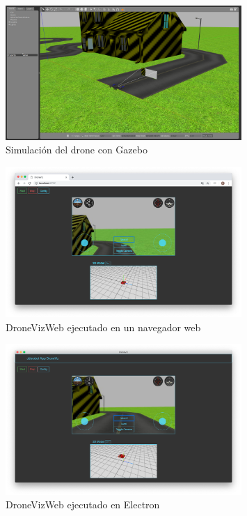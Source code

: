 \begin{figure}[H]
  \begin{center}
    \includegraphics[width=0.8\textwidth]{figures/gazebodrone.png}
    		\caption{Simulación del drone con Gazebo}
		\label{fig.testcamserver1}
		\end{center}
\end{figure}
\begin{figure}[H]
  \begin{center}
    \includegraphics[width=0.8\textwidth]{figures/droneviznode.png}
    		\caption{DroneVizWeb ejecutado en un navegador web}
		\label{fig.droneviznode}
		\end{center}
\end{figure}
\begin{figure}[H]
  \begin{center}
    \includegraphics[width=0.8\textwidth]{figures/dronevizelectron.png}
    		\caption{DroneVizWeb ejecutado en Electron}
		\label{fig.dronevizelectron}
		\end{center}
\end{figure}











